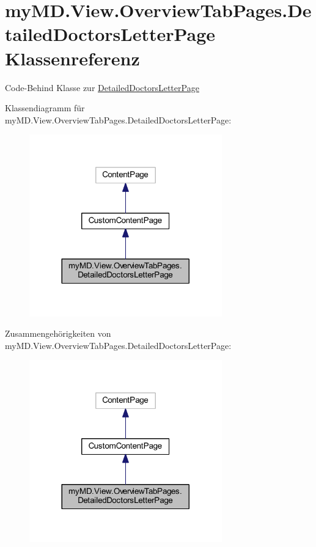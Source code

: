 \hypertarget{classmy_m_d_1_1_view_1_1_overview_tab_pages_1_1_detailed_doctors_letter_page}{}\section{my\+M\+D.\+View.\+Overview\+Tab\+Pages.\+Detailed\+Doctors\+Letter\+Page Klassenreferenz}
\label{classmy_m_d_1_1_view_1_1_overview_tab_pages_1_1_detailed_doctors_letter_page}


Code-\/\+Behind Klasse zur \mbox{\hyperlink{classmy_m_d_1_1_view_1_1_overview_tab_pages_1_1_detailed_doctors_letter_page}{Detailed\+Doctors\+Letter\+Page}}  




Klassendiagramm für my\+M\+D.\+View.\+Overview\+Tab\+Pages.\+Detailed\+Doctors\+Letter\+Page\+:
\nopagebreak
\begin{figure}[H]
\begin{center}
\leavevmode
\includegraphics[width=236pt]{classmy_m_d_1_1_view_1_1_overview_tab_pages_1_1_detailed_doctors_letter_page__inherit__graph}
\end{center}
\end{figure}


Zusammengehörigkeiten von my\+M\+D.\+View.\+Overview\+Tab\+Pages.\+Detailed\+Doctors\+Letter\+Page\+:
\nopagebreak
\begin{figure}[H]
\begin{center}
\leavevmode
\includegraphics[width=236pt]{classmy_m_d_1_1_view_1_1_overview_tab_pages_1_1_detailed_doctors_letter_page__coll__graph}
\end{center}
\end{figure}
